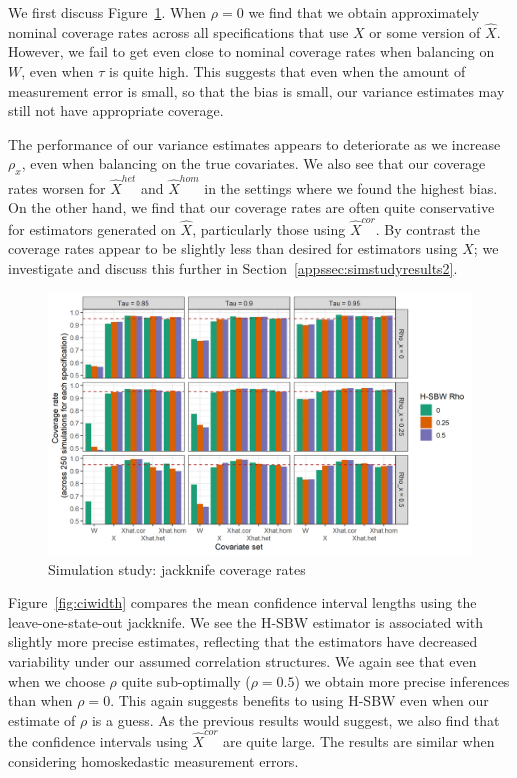We first discuss Figure~\ref{fig:simcoverage1}. When $\rho = 0$ we find that we obtain approximately nominal coverage rates across all specifications that use $X$ or some version of $\hat{X}$. However, we fail to get even close to nominal coverage rates when balancing on $W$, even when $\tau$ is quite high. This suggests that even when the amount of measurement error is small, so that the bias is small, our variance estimates may still not have appropriate coverage.

The performance of our variance estimates appears to deteriorate as we increase $\rho_x$, even when balancing on the true covariates. We also see that our coverage rates worsen for $\hat{X}^{het}$ and $\hat{X}^{hom}$ in the settings where we found the highest bias. On the other hand, we find that our coverage rates are often quite conservative for estimators generated on $\hat{X}$, particularly those using $\hat{X}^{cor}$. By contrast the coverage rates appear to be slightly less than desired for estimators using $X$; we investigate and discuss this further in Section~\ref{appssec:simstudyresults2}. 

\begin{figure}[H]
\begin{center}
    \caption{Simulation study: jackknife coverage rates}\label{fig:simcoverage1}
    \includegraphics[scale=0.5]{01_Plots/coverage-plot-1.png}
\end{center}
\end{figure}

Figure~\ref{fig:ciwidth} compares the mean confidence interval lengths using the leave-one-state-out jackknife. We see the H-SBW estimator is associated with slightly more precise estimates, reflecting that the estimators have decreased variability under our assumed correlation structures. We again see that even when we choose $\rho$ quite sub-optimally ($\rho = 0.5$) we obtain more precise inferences than when $\rho = 0$. This again suggests benefits to using H-SBW even when our estimate of $\rho$ is a guess. As the previous results would suggest, we also find that the confidence intervals using $\hat{X}^{cor}$ are quite large. The results are similar when considering homoskedastic measurement errors. 

